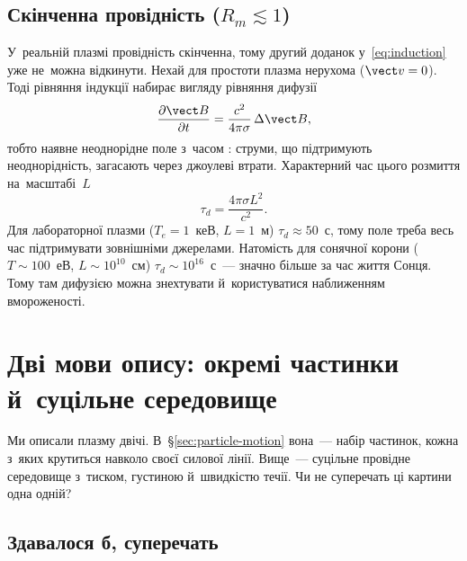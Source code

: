 \subsection{Скінченна провідність (\texorpdfstring{$R_m\lesssim1$}{R_m < 1})}



У~реальній плазмі провідність скінченна, тому другий доданок у~\eqref{eq:induction} уже
не~можна відкинути. Нехай для простоти плазма нерухома ($\vect v=0$). Тоді рівняння
індукції набирає вигляду рівняння дифузії
\begin{equation*}
    \frac{\partial\vect B}{\partial t}
    =\frac{c^2}{4\pi\sigma}\,\Delta\vect B,
\end{equation*}
тобто наявне неоднорідне поле з~часом : струми, що підтримують
неоднорідність, загасають через джоулеві втрати. Характерний час цього розмиття
на~масштабі~$L$
\begin{equation*}
    \tau_d=\frac{4\pi\sigma L^2}{c^2}.
\end{equation*}
Для лабораторної плазми ($T_e=1$~кеВ, $L=1$~м) $\tau_d\approx50$~с, тому поле треба весь
час підтримувати зовнішніми джерелами. Натомість для сонячної корони ($T\sim100$~еВ,
$L\sim10^{10}$~см) $\tau_d\sim10^{16}$~с~--- значно більше за час життя Сонця. Тому там
дифузією можна знехтувати й~користуватися наближенням вмороженості.



\section{Дві мови опису: окремі частинки й~суцільне середовище}\label{sec:new-two-descriptions}



Ми описали плазму двічі. В~§\ref{sec:particle-motion} вона~--- набір частинок, кожна
з~яких крутиться навколо своєї силової лінії. Вище~--- суцільне провідне середовище
з~тиском, густиною й~швидкістю течії. Чи не суперечать ці картини одна одній?



\subsection{Здавалося б, суперечать}



